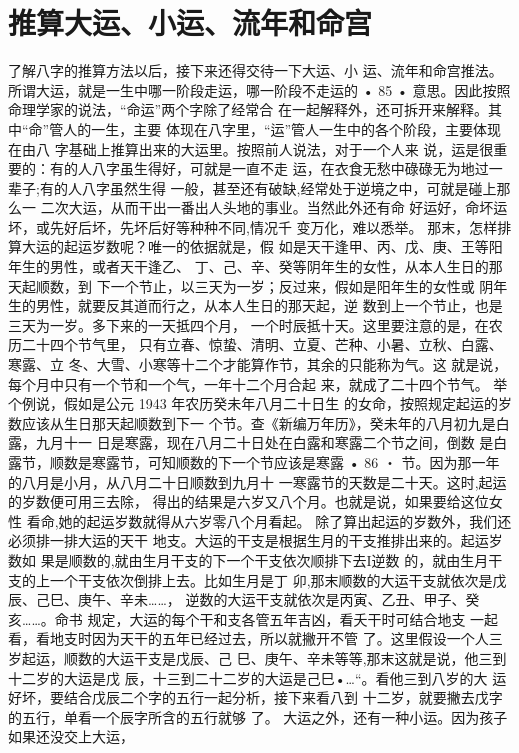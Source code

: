 \section{推算大运、小运、流年和命宫}
了解八字的推算方法以后，接下来还得交待一下大运、小
运、流年和命宫推法。
所谓大运，就是一生中哪一阶段走运，哪一阶段不走运的
• 85 •
意思。因此按照命理学家的说法，“命运”两个字除了经常合
在一起解释外，还可拆开来解释。其中“命”管人的一生，主要
体现在八字里，“运”管人一生中的各个阶段，主要体现在由八
字基础上推算出来的大运里。按照前人说法，对于一个人来
说，运是很重要的：有的人八字虽生得好，可就是一直不走
运，在衣食无愁中碌碌无为地过一辈子;有的人八字虽然生得
一般，甚至还有破缺,经常处于逆境之中，可就是碰上那么一
二次大运，从而干出一番出人头地的事业。当然此外还有命
好运好，命坏运坏，或先好后坏，先坏后好等种种不同,情况千
变万化，难以悉举。
那末，怎样排算大运的起运岁数呢？唯一的依据就是，假
如是天干逢甲、丙、戊、庚、王等阳年生的男性，或者天干逢乙、
丁、己、辛、癸等阴年生的女性，从本人生日的那天起顺数，到
下一个节止，以三天为一岁；反过来，假如是阳年生的女性或
阴年生的男性，就要反其道而行之，从本人生日的那天起，逆
数到上一个节止，也是三天为一岁。多下来的一天抵四个月，
一个时辰抵十天。这里要注意的是，在农历二十四个节气里，
只有立春、惊蛰、清明、立夏、芒种、小暑、立秋、白露、寒露、立
冬、大雪、小寒等十二个才能算作节，其余的只能称为气。这
就是说，每个月中只有一个节和一个气，一年十二个月合起
来，就成了二十四个节气。
举个例说，假如是公元 1943 年农历癸未年八月二十日生
的女命，按照规定起运的岁数应该从生日那天起顺数到下一
个节。查《新编万年历》，癸未年的八月初九是白露，九月十一
日是寒露，现在八月二十日处在白露和寒露二个节之间，倒数
是白露节，顺数是寒露节，可知顺数的下一个节应该是寒露
• 86 ・
节。因为那一年的八月是小月，从八月二十日顺数到九月十
一寒露节的天数是二十天。这时,起运的岁数便可用三去除，
得出的结果是六岁又八个月。也就是说，如果要给这位女性
看命,她的起运岁数就得从六岁零八个月看起。
除了算出起运的岁数外，我们还必须排一排大运的天干
地支。大运的干支是根据生月的干支推排出来的。起运岁数如
果是顺数的,就由生月干支的下一个干支依次顺排下去I逆数
的，就由生月干支的上一个干支依次倒排上去。比如生月是丁
卯,那末顺数的大运干支就依次是戊辰、己巳、庚午、辛未……，
逆数的大运干支就依次是丙寅、乙丑、甲子、癸亥……。命书
规定，大运的每个干和支各管五年吉凶，看夭干时可结合地支
一起看，看地支时因为天干的五年已经过去，所以就撇开不管
了。这里假设一个人三岁起运，顺数的大运干支是戊辰、己
巳、庚午、辛未等等,那末这就是说，他三到十二岁的大运是戊
辰，十三到二十二岁的大运是己巳•…“。看他三到八岁的大
运好坏，要结合戊辰二个字的五行一起分析，接下来看八到
十二岁，就要撇去戊字的五行，单看一个辰字所含的五行就够
了。
大运之外，还有一种小运。因为孩子如果还没交上大运，

